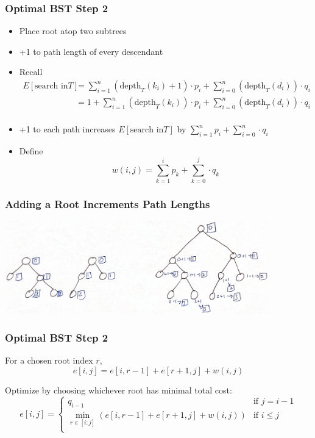 \documentclass{beamer}
\begin{document}
\begin{frame} \frametitle{Optimal BST Step 2}
  \begin{itemize}
    \item Place root atop two subtrees
    \item +1 to path length of every descendant
    \item Recall
      \begin{align*}
        E[\text{search in} T] & = \sum_{i=1}^n (\text{depth}_T(k_i)+1) \cdot p_i + \sum_{i=0}^n (\text{depth}_T(d_i)) \cdot q_i \\
          & = 1 + \sum_{i=1}^n (\text{depth}_T(k_i)) \cdot p_i + \sum_{i=0}^n (\text{depth}_T(d_i)) \cdot q_i \\
      \end{align*}
    \item +1 to each path increases $E[\text{search in} T]$ by
      $ \sum_{i=1}^n p_i + \sum_{i=0}^n \cdot q_i $
    \item Define
      \[ w(i, j) = \sum_{k=1}^i p_k + \sum_{k=0}^j \cdot q_k \]
    \end{itemize}
\end{frame}

\begin{frame} \frametitle{Adding a Root Increments Path Lengths}
\begin{center}
  \includegraphics[width=4.5in]{add_root.png}
\end{center}
\end{frame}

\begin{frame} \frametitle{Optimal BST Step 2}
  For a chosen root index $r,$
  \[ e[i, j] = e[i, r-1] + e[r+1, j] + w(i, j) \]

  Optimize by choosing whichever root has minimal total cost:
  \[
    e[i, j] = 
        \begin{cases}
          q_{i-1} & \text{if } j=i-1 \\
          \min_{r \in [i:j]} (e[i, r-1] + e[r+1, j] + w(i, j)) & \text{if } i \leq j \\
        \end{cases} 
  \]
\end{frame}
\end{document}
